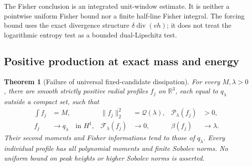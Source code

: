 \documentclass[11pt]{article}
\numberwithin{equation}{section}
\newtheorem{theorem}{Theorem}[section]
\newcommand{\R}{\mathbb R}
\begin{document}
The Fisher conclusion is an integrated unit-window estimate. It is
neither a pointwise uniform Fisher bound nor a finite half-line Fisher
integral. The forcing bound uses the exact divergence structure
$\delta\operatorname{div}(vh)$; it does not treat the logarithmic entropy
test as a bounded dual-Lipschitz test.

\subsection{Positive production at exact mass and energy}

\begin{theorem}[Failure of universal fixed-candidate dissipation]
\label{r14:obstruction}
For every $M,\lambda>0$, there are smooth strictly positive radial
profiles $f_j$ on $\R^3$, each equal to $q_\lambda$ outside a compact
set, such that
\begin{align}
 \int f_j&=M,& \|f_j\|_2^2&=\mathcal Q(\lambda),&
 \mathcal P_\lambda(f_j)&>0,\label{r14:exactcounterstates}\\
 f_j&\longrightarrow q_\lambda\quad\text{in }H^1,&
 \mathcal F_\lambda(f_j)&\longrightarrow0,&
 \beta(f_j)&\longrightarrow\lambda.\nonumber
\end{align}
Their second moments and Fisher informations tend to those of
$q_\lambda$. Every individual profile has all polynomial moments and
finite Sobolev norms. No uniform bound on peak heights or higher
Sobolev norms is asserted.
\end{theorem}
\end{document}
